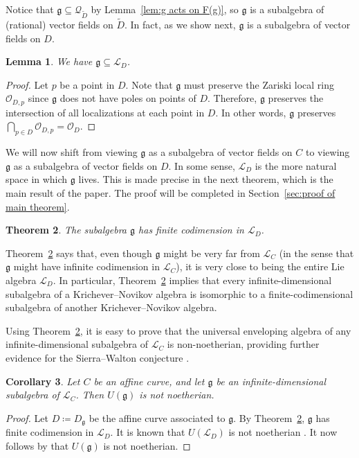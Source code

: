 \documentclass[12pt]{amsart}
\theoremstyle{plain}
\newtheorem{theorem}{Theorem}[section]
\newtheorem{lemma}[theorem]{Lemma}
\newtheorem{corollary}[theorem]{Corollary}
\theoremstyle{definition}
\numberwithin{equation}{section}
\def\g{\mathfrak{g}}
\def\L{\mathcal{L}}
\def\O{\mathcal{O}}
\def\Q{\mathcal{Q}}
\begin{document}
Notice that $\g \subseteq \Q_{\widetilde{D}}$ by Lemma~\ref{lem:g acts on F(g)}, so $\g$ is a subalgebra of (rational) vector fields on $\widetilde{D}$. In fact, as we show next, $\g$ is a subalgebra of vector fields on $D$.

\begin{lemma}
    We have $\g \subseteq \L_{D}$.
\end{lemma}
\begin{proof}
    Let $p$ be a point in $D$. Note that $\g$ must preserve the Zariski local ring $\O_{D,p}$ since $\g$ does not have poles on points of $D$. Therefore, $\g$ preserves the intersection of all localizations at each point in $D$. In other words, $\g$ preserves $\bigcap_{p \in D} \O_{D,p} = \O_D$.
\end{proof}

We will now shift from viewing $\g$ as a subalgebra of vector fields on $C$ to viewing $\g$ as a subalgebra of vector fields on $D$. In some sense, $\L_{D}$ is the more natural space in which $\g$ lives. This is made precise in the next theorem, which is the main result of the paper. The proof will be completed in Section~\ref{sec:proof of main theorem}.

\begin{theorem}\label{thm:main}
    The subalgebra $\g$ has finite codimension in $\L_{D}$.
\end{theorem}

Theorem~\ref{thm:main} says that, even though $\g$ might be very far from $\L_C$ (in the sense that $\g$ might have infinite codimension in $\L_C$), it is very close to being the entire Lie algebra $\L_{D}$. In particular, Theorem~\ref{thm:main} implies that every infinite-dimensional subalgebra of a Krichever--Novikov algebra is isomorphic to a finite-codimensional subalgebra of another Krichever--Novikov algebra.

Using Theorem~\ref{thm:main}, it is easy to prove that the universal enveloping algebra of any infinite-dimensional subalgebra of $\L_C$ is non-noetherian, providing further evidence for the Sierra--Walton conjecture \cite[Conjecture 0.1]{SierraWalton}.

\begin{corollary}\label{cor:noetherian}
    Let $C$ be an affine curve, and let $\g$ be an infinite-dimensional subalgebra of $\L_C$. Then $U(\g)$ is not noetherian.
\end{corollary}
\begin{proof}
    Let $D \coloneqq D_\g$ be the affine curve associated to $\g$. By Theorem~\ref{thm:main}, $\g$ has finite codimension in $\L_D$. It is known that $U(\L_D)$ is not noetherian \cite[Theorem 3.3]{Buzaglo}. It now follows by \cite[Proposition 2.1]{Buzaglo} that $U(\g)$ is not noetherian.
\end{proof}
\end{document}
